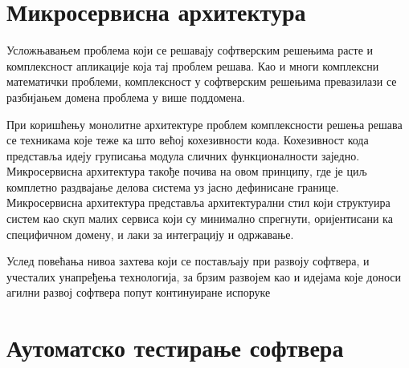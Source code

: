 \documentclass[12pt,oneside]{memoir}
\begin{document}
\chapter{Микросервисна архитектура}
\label{chp:mikroservisi}


Усложњавањем проблема који се решавају софтверским решењима расте и комплексност апликације која тај проблем решава. Као и многи комплексни математички проблеми, комплексност у софтверским решењима превазилази се разбијањем домена проблема у више поддомена. 

При коришћењу монолитне архитектуре проблем комплексности решења решава се техникама које теже ка што већој кохезивности кода. Кохезивност кода представља идеју груписања модула сличних функционалности заједно. 
Микросервисна архитектура такође почива на овом принципу, где је циљ комплетно раздвајање делова система уз јасно дефинисане границе. Микросервисна архитектура представља архитектурални стил који структуира систем као скуп малих сервиса који су минимално спрегнути, оријентисани ка специфичном домену, и лаки за интеграцију и одржавање. 






Услед повећања нивоа захтева који се постављају при развоју софтвера, и учесталих унапређења технологија, 
за брзим развојем као и идејама које доноси агилни развој софтвера попут континуиране испоруке 

\chapter{Аутоматско тестирање софтвера}
\label{chp:testiranje}
\end{document}
